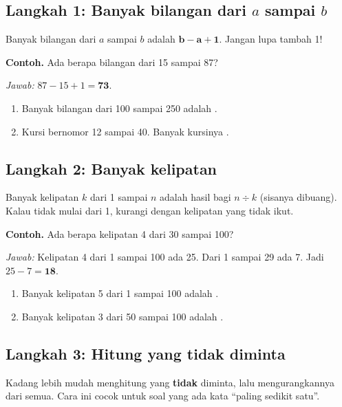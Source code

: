 \documentclass[11pt,a4paper]{article}
\begin{document}
\subsection*{Langkah 1: Banyak bilangan dari $a$ sampai $b$}
Banyak bilangan dari $a$ sampai $b$ adalah $\mathbf{b - a + 1}$. Jangan lupa tambah 1!

\begin{contoh}
\textbf{Contoh.} Ada berapa bilangan dari 15 sampai 87?

\textit{Jawab:} $87 - 15 + 1 = \textbf{73}$.
\end{contoh}

\begin{giliranmu}
\begin{enumerate}[label=\alph*.]
    \item Banyak bilangan dari 100 sampai 250 adalah \kosong.
    \item Kursi bernomor 12 sampai 40. Banyak kursinya \kosong.
\end{enumerate}
\end{giliranmu}

\subsection*{Langkah 2: Banyak kelipatan}
Banyak kelipatan $k$ dari 1 sampai $n$ adalah hasil bagi $n \div k$ (sisanya dibuang).
Kalau tidak mulai dari 1, kurangi dengan kelipatan yang tidak ikut.

\begin{contoh}
\textbf{Contoh.} Ada berapa kelipatan 4 dari 30 sampai 100?

\textit{Jawab:} Kelipatan 4 dari 1 sampai 100 ada 25. Dari 1 sampai 29 ada 7. Jadi
$25 - 7 = \textbf{18}$.
\end{contoh}

\begin{giliranmu}
\begin{enumerate}[label=\alph*.]
    \item Banyak kelipatan 5 dari 1 sampai 100 adalah \kosong.
    \item Banyak kelipatan 3 dari 50 sampai 100 adalah \kosong.
\end{enumerate}
\end{giliranmu}

\subsection*{Langkah 3: Hitung yang tidak diminta}
Kadang lebih mudah menghitung yang \textbf{tidak} diminta, lalu mengurangkannya dari semua.
Cara ini cocok untuk soal yang ada kata ``paling sedikit satu''.
\end{document}
